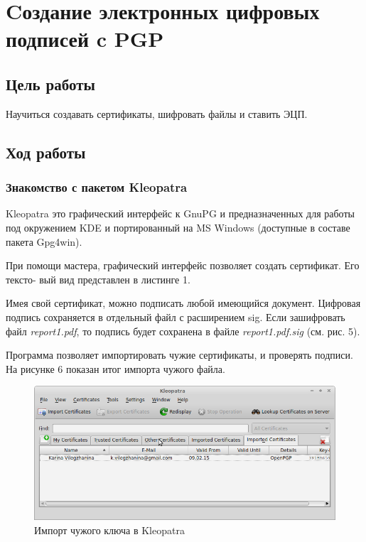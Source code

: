 \documentclass[12pt,a4paper]{article}
\begin{document}
\section{Cоздание электронных цифровых подписей c PGP}

\subsection{Цель работы}
Научиться создавать сертификаты, шифровать файлы и ставить ЭЦП.
\subsection{Ход работы}

\subsubsection{Знакомство с пакетом Kleopatra}
Kleopatra это графический интерфейс к GnuPG и предназначенных для работы под
окружением KDE и портированный на MS Windows (доступные в составе пакета Gpg4win).

При помощи мастера, графический интерфейс позволяет создать сертификат. Его тексто-
вый вид представлен в листинге 1.


Имея свой сертификат, можно подписать любой имеющийся документ. Цифровая подпись сохраняется в отдельный файл с расширением sig. Если зашифровать файл \textit{report1.pdf}, то подпись будет сохранена в файле \textit{report1.pdf.sig} (см. рис. 5).

Программа позволяет импортировать чужие сертификаты, и проверять подписи. На рисунке
6 показан итог импорта чужого файла.


\begin{figure}[h!]
\centering
\includegraphics[scale=0.5]{res/karina}
\caption{Импорт чужого ключа в Kleopatra}
\end{figure}
\end{document}
